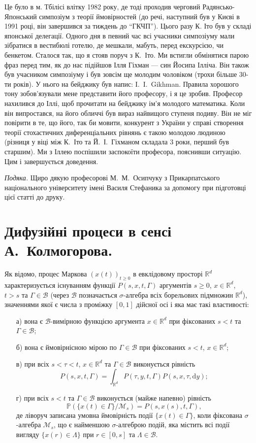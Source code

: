\documentclass[11pt, reqno]{amsart}
\begin{document}
Це було в м. Тбілісі влітку 1982 року, де тоді проходив черговий Радянсько-Японський симпозіум з
теорії ймовірностей (до речі, наступний був у Києві в 1991 році, він завершився за тиждень до ``ГКЧП''). Цього разу К. Іто був у складі японської делегації. Одного дня в певний час всі учасники симпозіуму мали зібратися в вестибюлі готелю, де мешкали, мабуть, перед екскурсією, чи бенкетом. Сталося так, що я стояв поруч з К.~Іто. Ми встигли обмінятися парою фраз перед тим, як до нас підійшов Ілля Гіхман --- син Йосипа Ілліча. Він також був учасником симпозіуму і був зовсім ще молодим чоловіком (трохи більше 30-ти років). У нього на бейджику був напис: I.~I.~Gikhman. Правила хорошого тону зобов’язували мене представити його професору, і я це зробив. Професор нахилився до Іллі, щоб прочитати на бейджику ім’я молодого математика. Коли він випростався, на його обличчі був вираз найвищого ступеня подиву. Він не міг повірити в те, що його, так би мовити, конкурент з України у справі створення теорії стохастичних диференціальних рівнянь є такою молодою людиною (різниця у віці між К.~Іто та Й.~І.~Гіхманом складала 3 роки, перший був старшим). Ми з Іллею поспішили заспокоїти професора, пояснивши ситуацію. Цим і завершується доведення.

\textit{Подяка.} Щиро дякую професорові М.~М.~Осипчуку з Прикарпатського національного університету імені Василя Стефаника за допомогу при підготовці цієї статті до друку.


\section{Дифузійні процеси в сенсі А.~Колмогорова.}

Як відомо, процес Маркова $(x(t))_{t\geq 0}$ в евклідовому просторі $\mathbb{R}^d$ характеризується існуванням функції $P(s,x,t,\Gamma)$ аргументів $s\geq0$, $x\in\mathbb{R}^d$, $t>s$ та $\Gamma\in\mathcal{B}$ (через $\mathcal{B}$ позначається $\sigma$-алгебра всіх борельових підмножин $\mathbb{R}^d$), значеннями якої є числа з проміжку $[0,1]$ дійсної осі і яка має такі властивості:
\begin{enumerate}
	\item[а)] вона є $\mathcal{B}$-вимірною функцією аргумента $x\in\mathbb{R}^d$ при фіксованих $s<t$ та $\Gamma\in\mathcal{B}$;
	\item[б)] вона є ймовірнісною мірою по $\Gamma\in\mathcal{B}$ при фіксованих $s<t$, $x\in\mathbb{R}^d$;
	\item[в)] при всіх $s<\tau<t$, $x\in\mathbb{R}^d$ та $\Gamma\in\mathcal{B}$ виконується рівність
	$$
	P(s,x,t,\Gamma)= \int_{\mathbb{R}^d}P(\tau,y,t,\Gamma)P(s,x,\tau,\mathrm{d}y);
	$$
	\item[г)] при всіх $s<t$ та $\Gamma\in\mathcal{B}$ виконується (майже напевно) рівність
	$$\mathbb{P}\left(\{x(t)\in\Gamma\}/\mathcal{M}_{s}\right)=P(s,x(s),t,\Gamma),$$
	де ліворуч записана умовна ймовірність події $\{x(t)\in\Gamma\}$, коли фіксована $\sigma$-алгебра $\mathcal{M}_{s}$, що є найменшою $\sigma$-алгеброю подій, яка містить всі події вигляду  $\{x(r)\in\Lambda\}$ при $r\in[0,s]$ та $\Lambda\in\mathcal{B}$.
\end{enumerate}
\end{document}
